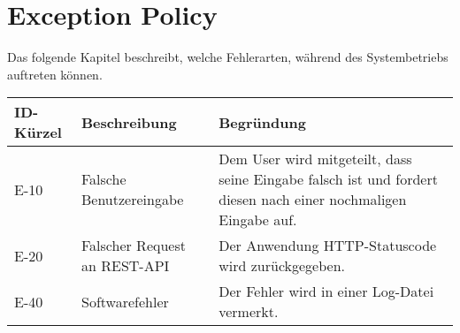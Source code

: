 
\chapter{Exception Policy}
Das folgende Kapitel beschreibt, welche Fehlerarten, während des Systembetriebs auftreten können.

\begin{tabularx}{\textwidth}{|l|X|X|}
    \toprule
    \textbf{ID-Kürzel} & \textbf{Beschreibung} & \textbf{Begründung}\\
    \midrule
    \endhead
    \hline
    \caption{Exception Policy}
    
    \endfoot
    E-10 & Falsche Benutzereingabe & Dem User wird mitgeteilt, dass seine Eingabe falsch ist und fordert diesen nach einer nochmaligen Eingabe auf.\\ \hline
    E-20 & Falscher Request an REST-API & Der Anwendung HTTP-Statuscode wird zurückgegeben. \\ \hline
    E-40 & Softwarefehler & Der Fehler wird in einer Log-Datei vermerkt.  \\ \hline
  
  
\end{tabularx}